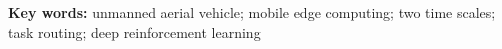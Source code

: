 \vspace{4mm}
\noindent\textbf{Key words:} unmanned aerial vehicle; mobile edge computing; two time scales; task routing; deep reinforcement learning

\vfill
{}

\vspace{4mm}
